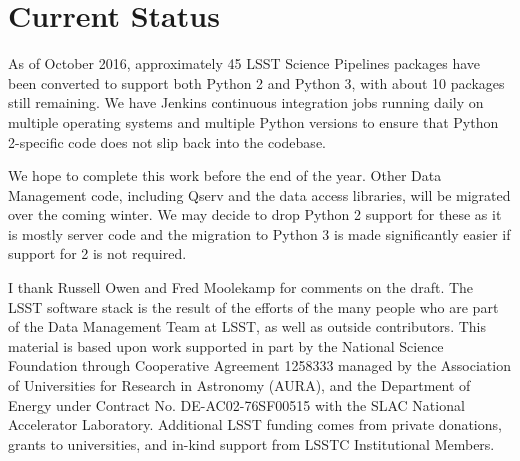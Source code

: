 \documentclass[11pt,twoside]{article}
\begin{document}
\section{Current Status}

As of October 2016, approximately 45 LSST Science Pipelines packages have been converted to support both Python 2 and Python 3, with about 10 packages still remaining.
We have Jenkins continuous integration jobs running daily on multiple operating systems and multiple Python versions to ensure that Python 2-specific code does not slip back into the codebase.

We hope to complete this work before the end of the year.
Other Data Management code, including Qserv \citep{Wang:2011:QDS:2063348.2063364} and the data access libraries, will be migrated over the coming winter.
We may decide to drop Python 2 support for these as it is mostly server code and the migration to Python 3 is made significantly easier if support for 2 is not required.

\acknowledgements I thank Russell Owen and Fred Moolekamp for comments on the draft.
The LSST software stack is the result of the efforts of the many people who are part of the Data Management Team at LSST, as well as outside contributors.
This material is based upon work supported in part by the National Science Foundation through Cooperative Agreement 1258333 managed by the Association of Universities for Research in Astronomy (AURA), and the Department of Energy under Contract No. DE-AC02-76SF00515 with the SLAC National Accelerator Laboratory. Additional LSST funding comes from private donations, grants to universities, and in-kind support from LSSTC Institutional Members.

\end{document}
